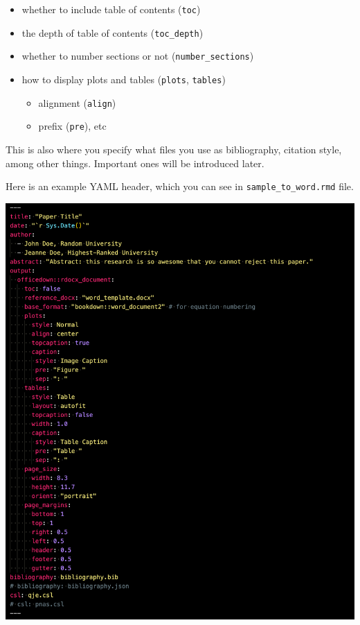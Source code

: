 \documentclass[
  letterpaper,
  DIV=11,
  numbers=noendperiod]{scrreprt}
\providecommand{\tightlist}{%
  \setlength{\itemsep}{0pt}\setlength{\parskip}{0pt}}\usepackage{longtable,booktabs,array}
\begin{document}
\begin{itemize}
\tightlist
\item
  whether to include table of contents (\texttt{toc})
\item
  the depth of table of contents (\texttt{toc\_depth})
\item
  whether to number sections or not (\texttt{number\_sections})
\item
  how to display plots and tables (\texttt{plots}, \texttt{tables})

  \begin{itemize}
  \tightlist
  \item
    alignment (\texttt{align})
  \item
    prefix (\texttt{pre}), etc
  \end{itemize}
\end{itemize}

This is also where you specify what files you use as bibliography,
citation style, among other things. Important ones will be introduced
later.

Here is an example YAML header, which you can see in
\texttt{sample\_to\_word.rmd} file.

\includegraphics[width=1\textwidth,height=\textheight]{assets/pictures/yaml-example.png}
\end{document}
